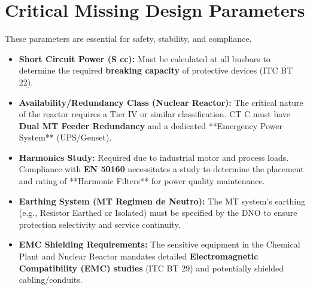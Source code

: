 \documentclass[10pt, a4paper]{article}
\begin{document}
\section{Critical Missing Design Parameters}
These parameters are essential for safety, stability, and compliance.

\begin{itemize}
    \item \textbf{Short Circuit Power (S cc):} Must be calculated at all busbars to determine the required \textbf{breaking capacity} of protective devices (ITC BT 22).
    \item \textbf{Availability/Redundancy Class (Nuclear Reactor):} The critical nature of the reactor requires a Tier IV or similar classification. CT C must have \textbf{Dual MT Feeder Redundancy} and a dedicated **Emergency Power System** (UPS/Genset).
    \item \textbf{Harmonics Study:} Required due to industrial motor and process loads. Compliance with \textbf{EN 50160} necessitates a study to determine the placement and rating of **Harmonic Filters** for power quality maintenance.
    \item \textbf{Earthing System (MT Regimen de Neutro):} The MT system's earthing (e.g., Resistor Earthed or Isolated) must be specified by the DNO to ensure protection selectivity and service continuity.
    \item \textbf{EMC Shielding Requirements:} The sensitive equipment in the Chemical Plant and Nuclear Reactor mandates detailed \textbf{Electromagnetic Compatibility (EMC) studies} (ITC BT 29) and potentially shielded cabling/conduits.
\end{itemize}
\end{document}
